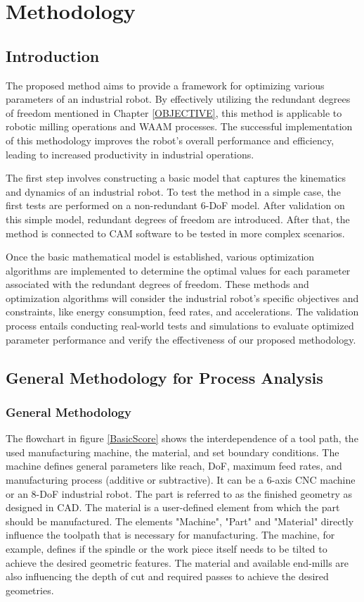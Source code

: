 \chapter{Methodology}%

\section{Introduction}%

The proposed method aims to provide a framework for optimizing various parameters of an industrial robot. By effectively utilizing the redundant degrees of freedom mentioned in Chapter \ref{OBJECTIVE}, this method is applicable to robotic milling operations and WAAM processes. The successful implementation of this methodology improves the robot's overall performance and efficiency, leading to increased productivity in industrial operations.

The first step involves constructing a basic model that captures the kinematics and dynamics of an industrial robot. To test the method in a simple case, the first tests are performed on a non-redundant 6-DoF model. After validation on this simple model, redundant degrees of freedom are introduced. After that, the method is connected to CAM software to be tested in more complex scenarios.

Once the basic mathematical model is established, various optimization algorithms are implemented to determine the optimal values for each parameter associated with the redundant degrees of freedom. These methods and optimization algorithms will consider the industrial robot's specific objectives and constraints, like energy consumption, feed rates, and accelerations. The validation process entails conducting real-world tests and simulations to evaluate optimized parameter performance and verify the effectiveness of our proposed methodology.


\section{General Methodology for Process Analysis}
\subsection{General Methodology}\label{general}

The flowchart in figure \ref{BasicScore} shows the interdependence of a tool path, the used manufacturing machine, the material, and set boundary conditions. The machine defines general parameters like reach, DoF, maximum feed rates, and manufacturing process (additive or subtractive). It can be a 6-axis CNC machine or an 8-DoF industrial robot. The part is referred to as the finished geometry as designed in CAD. The material is a user-defined element from which the part should be manufactured. The elements "Machine", "Part" and "Material" directly influence the toolpath that is necessary for manufacturing. The machine, for example, defines if the spindle or the work piece itself needs to be tilted to achieve the desired geometric features. The material and available end-mills are also influencing the depth of cut and required passes to achieve the desired geometries. 

